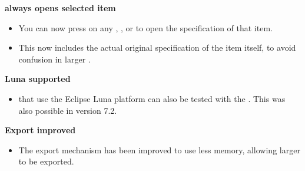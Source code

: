 \textbf{ always opens selected item}
\begin{itemize}
\item You can now press  on any \gdcase{}, \gdsuite{}, or \gdjob{} to open the specification of that item.
\item This now includes the actual original specification of the item itself, to avoid confusion in larger \gdprojects{}. 
\end{itemize}

\textbf{Luna \gdauts{} supported}
\begin{itemize}
\item \gdauts{} that use the Eclipse Luna platform can also be tested with the \ite{}. This was also possible in version 7.2.
\end{itemize}

\textbf{Export improved}
\begin{itemize}
\item The export mechanism has been improved to use less memory, allowing larger \gdprojects{} to be exported.
\end{itemize}
